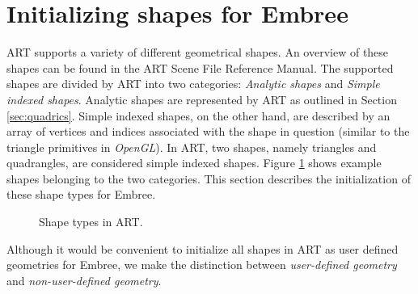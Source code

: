 \section{Initializing shapes for Embree}
ART supports a variety of different geometrical shapes. An overview of these shapes can be found in the ART Scene File Reference Manual. The supported shapes are divided by ART into two categories: \emph{Analytic shapes} and \emph{Simple indexed shapes}. Analytic shapes are represented by ART as outlined in Section \ref{sec:quadrics}. Simple indexed shapes, on the other hand, are described by an array of vertices and indices associated with the shape in question (similar to the triangle primitives in \emph{OpenGL}). In ART, two shapes, namely triangles and quadrangles, are considered simple indexed shapes. Figure \ref{fig:shape_types} shows example shapes belonging to the two categories. 
This section describes the initialization of these shape types for Embree.


\begin{figure}[!tbp]
	\centering
	\hfil
	\caption{Shape types in ART.}
	\label{fig:shape_types}
\end{figure}

Although it would be convenient to initialize all shapes in ART as user defined geometries for Embree, we make the distinction between \emph{user-defined geometry} and \emph{non-user-defined geometry}.

